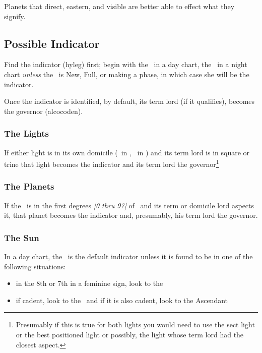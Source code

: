 Planets that direct, eastern, and visible are better able to effect what they signify.

\subsection{Possible Indicator}
Find the indicator (hyleg) first; begin with the \Sun\, in a day chart, the \Moon\, in a night chart \textsl{unless} the \Moon\,  is New, Full, or making a phase, in which case she will be the indicator.

Once the indicator is identified, by default, its term lord (if it qualifies), becomes the governor (alcocoden).

\subsubsection{The Lights}
If either light is in its own domicile (\Sun\, in \Leo, \Moon\, in \Cancer) and its term lord is in square or trine that light becomes the indicator and its term lord the governor\footnote{Presumably if this is true for both lights you would need to use the sect light or the best positioned light or possibly, the light whose term lord had the closest aspect.}

\subsubsection{The Planets}
If  the \Sun\, is in the first degrees \textsl{[0 thru 9?]} of \Aries\, and its term or domicile lord aspects it, that planet becomes the indicator and, presumably, his term lord the governor.

\subsubsection{The Sun}
In a day chart, the \Sun\, is the default indicator unless it is found to be in one of the following situations:
\vspace{-0.5em}
\begin{itemize}[topsep=0em,itemsep=0em]
\item {}in the 8th or 7th in a feminine sign, look to the \Moon
\item {}if cadent, look to the \Moon\, and if it is also cadent, look to the Ascendant
\end{itemize}

